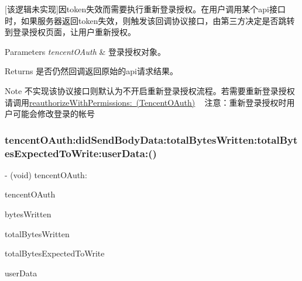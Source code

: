 \mbox{[}该逻辑未实现\mbox{]}因token失效而需要执行重新登录授权。在用户调用某个api接口时，如果服务器返回token失效，则触发该回调协议接口，由第三方决定是否跳转到登录授权页面，让用户重新授权。 
\begin{DoxyParams}{Parameters}
{\em tencent\+O\+Auth} & 登录授权对象。 \\
\hline
\end{DoxyParams}
\begin{DoxyReturn}{Returns}
是否仍然回调返回原始的api请求结果。 
\end{DoxyReturn}
\begin{DoxyNote}{Note}
不实现该协议接口则默认为不开启重新登录授权流程。若需要重新登录授权请调用\mbox{\hyperlink{interface_tencent_o_auth_a0cae2d11a0ac52e1877a05c05100669d}{reauthorize\+With\+Permissions\+: (Tencent\+O\+Auth)}} ~\newline
注意：重新登录授权时用户可能会修改登录的帐号 
\end{DoxyNote}
\mbox{\label{protocol_tencent_session_delegate-p_a389127c47a6ad7efbd1ec738efd7ad02}} 
\subsubsection{\texorpdfstring{tencent\+O\+Auth\+:did\+Send\+Body\+Data\+:total\+Bytes\+Written\+:total\+Bytes\+Expected\+To\+Write\+:user\+Data\+:()}{tencentOAuth:didSendBodyData:totalBytesWritten:totalBytesExpectedToWrite:userData:()}\hspace{0.1cm}{\footnotesize\ttfamily [1/2]}}
{\footnotesize\ttfamily -\/ (void) tencent\+O\+Auth\+: \begin{DoxyParamCaption}\item[{(\mbox{\hyperlink{interface_tencent_o_auth}{Tencent\+O\+Auth}} $\ast$)}]{tencent\+O\+Auth }\item[{didSendBodyData:(N\+S\+Integer)}]{bytes\+Written }\item[{totalBytesWritten:(N\+S\+Integer)}]{total\+Bytes\+Written }\item[{totalBytesExpectedToWrite:(N\+S\+Integer)}]{total\+Bytes\+Expected\+To\+Write }\item[{userData:(id)}]{user\+Data }\end{DoxyParamCaption}\hspace{0.3cm}{\ttfamily [optional]}}

